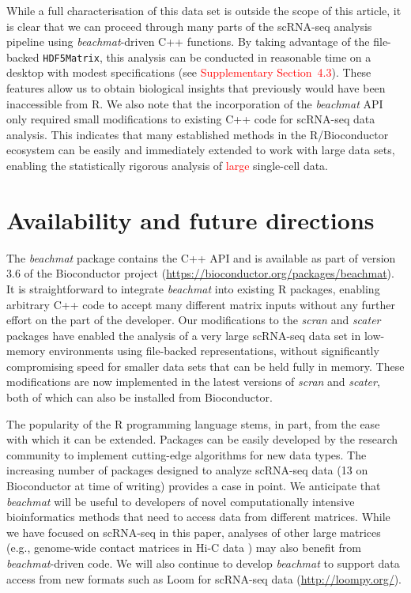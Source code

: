 \documentclass[10pt,letterpaper]{article}
\newcommand{\suppsecrealsystem}{4.3}
\newcommand{\beachmat}{\textit{beachmat}}
\newcommand{\code}[1]{\texttt{#1}}
\newcommand{\revised}[1]{\textcolor{red}{#1}}
\begin{document}
While a full characterisation of this data set is outside the scope of this article, it is clear that we can proceed through many parts of the scRNA-seq analysis pipeline using \beachmat{}-driven C++ functions.
By taking advantage of the file-backed \code{HDF5Matrix}, this analysis can be conducted in reasonable time on a desktop with modest specifications (see \revised{Supplementary Section~\suppsecrealsystem{}}).
These features allow us to obtain biological insights that previously would have been inaccessible from R.
We also note that the incorporation of the \beachmat{} API only required small modifications to existing C++ code for scRNA-seq data analysis.
This indicates that many established methods in the R/Bioconductor ecosystem can be easily and immediately extended to work with large data sets,
enabling the statistically rigorous analysis of \revised{large} single-cell data.

\section*{Availability and future directions}
The \beachmat{} package contains the C++ API and is available as part of version 3.6 of the Bioconductor project (\url{https://bioconductor.org/packages/beachmat}).
It is straightforward to integrate \beachmat{} into existing R packages, enabling arbitrary C++ code to accept many different matrix inputs without any further effort on the part of the developer.
Our modifications to the \textit{scran} and \textit{scater} packages have enabled the analysis of a very large scRNA-seq data set in low-memory environments using file-backed representations, without significantly compromising speed for smaller data sets that can be held fully in memory.
These modifications are now implemented in the latest versions of \textit{scran} and \textit{scater}, both of which can also be installed from Bioconductor.

The popularity of the R programming language stems, in part, from the ease with which it can be extended.
Packages can be easily developed by the research community to implement cutting-edge algorithms for new data types.
The increasing number of packages designed to analyze scRNA-seq data (13 on Bioconductor at time of writing) provides a case in point.
We anticipate that \beachmat{} will be useful to developers of novel computationally intensive bioinformatics methods that need to access data from different matrices.
While we have focused on scRNA-seq in this paper, analyses of other large matrices (e.g., genome-wide contact matrices in Hi-C data \cite{lun2016infrastructure}) may also benefit from \beachmat{}-driven code.
We will also continue to develop \beachmat{} to support data access from new formats such as Loom for scRNA-seq data (\url{http://loompy.org/}).
\end{document}
